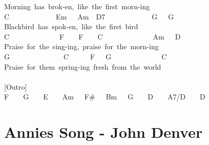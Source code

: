 \documentclass[]{book}
\let\stdsection\section
\renewcommand\section{\clearpage\stdsection}
\begin{document}
Morning~has~brok-en,~like~the~first~morn-ing\\
C~~~~~~~~~~~~~Em~~~Am~~D7~~~~~~~~~~~~~G~~~G\\
Blackbird~has~spok-en,~like~the~first~bird\\
C~~~~~~~~~~~~~~F~~~~F~~~~C~~~~~~~~~~~~~~Am~~~D\\
Praise~for~the~sing-ing,~praise~for~the~morn-ing\\
G~~~~~~~~~~~~~~~C~~~~~~F~~~G~~~~~~~~~~~~~~C\\
Praise~for~them~spring-ing~fresh~from~the~world\\
~\\
{[}Outro{]}\\
F~~~~G~~~~E~~~~Am~~~F\#~~~Bm~~~G~~~~D~~~~A7/D~~~~D\\

\hypertarget{annies-song---john-denver}{%
\section{Annies Song - John Denver}\label{annies-song---john-denver}}
\end{document}
